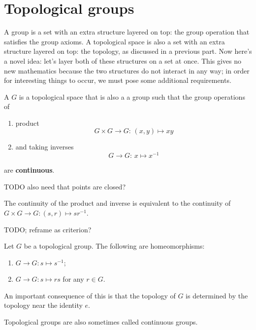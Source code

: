 \section{Topological groups}
A group is a set with an extra structure layered on top: the group operation that satisfies the group axioms. A topological space is also a set with an extra structure layered on top: the topology, as discussed in a previous part. Now here's a novel idea: let's layer both of these structures on a set at once. This gives no new mathematics because the two structures do not interact in any way; in order for interesting things to occur, we must pose some additional requirements.

\begin{definition}
A  $G$ is a topological space that is also a a group such that the group operations of
\begin{enumerate}
\item product
\[ G\times G \to G: \, (x,y)\mapsto xy \]
\item and taking inverses
\[ G\to G: \, x\mapsto x^{-1} \]
\end{enumerate}
are \textbf{continuous}.
\end{definition}
TODO also need that points are closed?

\begin{lemma}
The continuity of the product and inverse is equivalent to the continuity of $G\times G \to G: (s,r)\mapsto sr^{-1}$.
\end{lemma}
TODO; reframe as criterion?

\begin{lemma}
Let $G$ be a topological group. The following are homeomorphisms:
\begin{enumerate}
\item $G\to G: s\mapsto s^{-1}$;
\item $G\to G: s\mapsto rs$ for any $r\in G$.
\end{enumerate}
\end{lemma}
An important consequence of this is that the topology of $G$ is determined by the topology near the identity $e$.

Topological groups are also sometimes called continuous groups.

